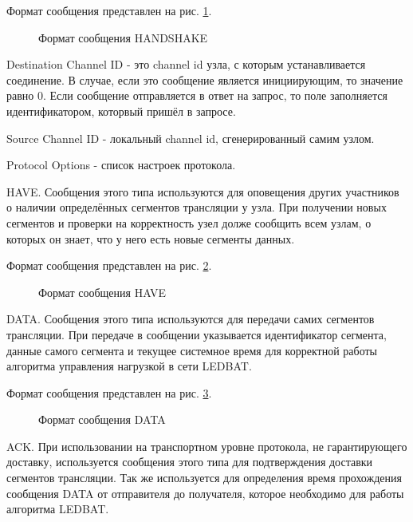 		Формат сообщения представлен на рис. \ref{img:ppspp-message-handshake}.

		\begin{figure}[H]
			\caption{Формат сообщения HANDSHAKE}
			\label{img:ppspp-message-handshake}
		\end{figure}

		Destination Channel ID - это channel id узла, с которым устанавливается соединение.
			В случае, если это сообщение является инициирующим, то значение равно 0. Если сообщение
			отправляется в ответ на запрос, то поле заполняется идентификатором, которвый пришёл в запросе.

		Source Channel ID - локальный channel id, сгенерированный самим узлом.

		Protocol Options - список настроек протокола.

		HAVE. Сообщения этого типа используются для оповещения других участников о наличии определённых
		сегментов трансляции у узла. При получении новых сегментов и проверки на корректность узел долже сообщить всем
		узлам, о которых он знает, что у него есть новые сегменты данных.

		Формат сообщения представлен на рис. \ref{img:ppspp-message-have}.
		\begin{figure}[h]
			\caption{Формат сообщения HAVE}
			\label{img:ppspp-message-have}
		\end{figure}

		DATA. Сообщения этого типа используются для передачи самих сегментов трансляции. При передаче в
		сообщении указывается идентификатор сегмента, данные самого сегмента и текущее системное время для корректной
		работы алгоритма управления нагрузкой в сети LEDBAT.

		Формат сообщения представлен на рис. \ref{img:ppspp-message-data}.
		\begin{figure}[h]
			\caption{Формат сообщения DATA}
			\label{img:ppspp-message-data}
		\end{figure}


		ACK. При использовании на транспортном уровне протокола, не гарантирующего доставку, используется
		сообщения этого типа для подтверждения доставки сегментов трансляции. Так же используется для определения
		время прохождения сообщения DATA от отправителя до получателя, которое необходимо для работы алгоритма
		LEDBAT.

